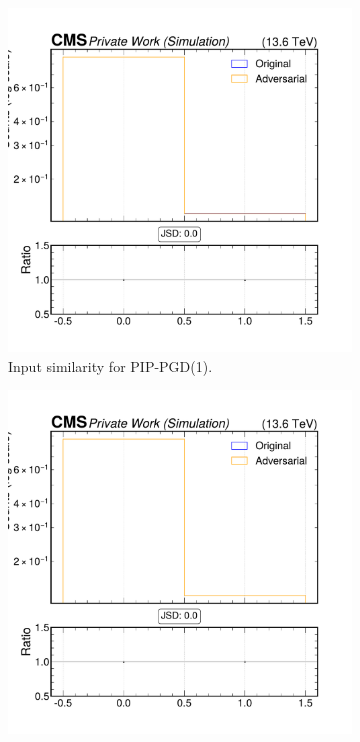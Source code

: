 \begin{figure}[h]
  \centering
  \begin{subfigure}[t]{0.32\textwidth}
    \includegraphics[width=\linewidth]{media/output/features/compare/combined_it_1/cmp_npf_arr_Npfcan_isGamma.pdf}
    \caption*{Input similarity for PIP-PGD(1).}
  \end{subfigure}\hfill
  \begin{subfigure}[t]{0.32\textwidth}
    \includegraphics[width=\linewidth]{media/output/features/compare/combined_it_2/cmp_npf_arr_Npfcan_isGamma.pdf}

\end{subfigure}
\end{figure}
